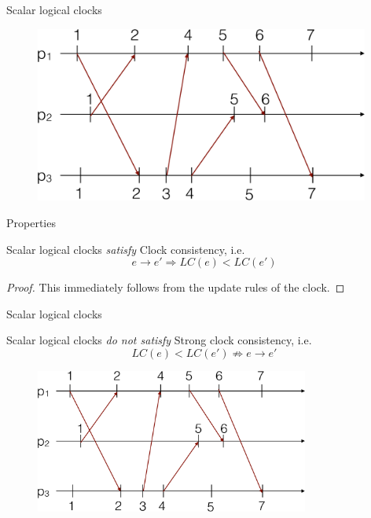 \begin{frame}{Scalar logical clocks}

\begin{figure} 
\includegraphics[width=11cm]{figs/03/diagram4}
\end{figure}

\end{frame}


\begin{frame}{Properties}

\begin{theorem}
Scalar logical clocks \emph{satisfy} Clock consistency, i.e.
\[
  e \rightarrow e' \Rightarrow LC(e) < LC(e')
\]
\end{theorem}

\pause
\begin{proof}
This immediately follows from the update rules of the clock.
\end{proof}




\end{frame}

\begin{frame}{Scalar logical clocks}

\begin{theorem}
Scalar logical clocks \emph{do not satisfy} Strong clock consistency, i.e.
\[
  LC(e) < LC(e') \not\Rightarrow e \rightarrow e' 
\]
\end{theorem}

\begin{figure} 
\includegraphics[width=9cm]{figs/03/diagram4}
\end{figure}



\end{frame}

